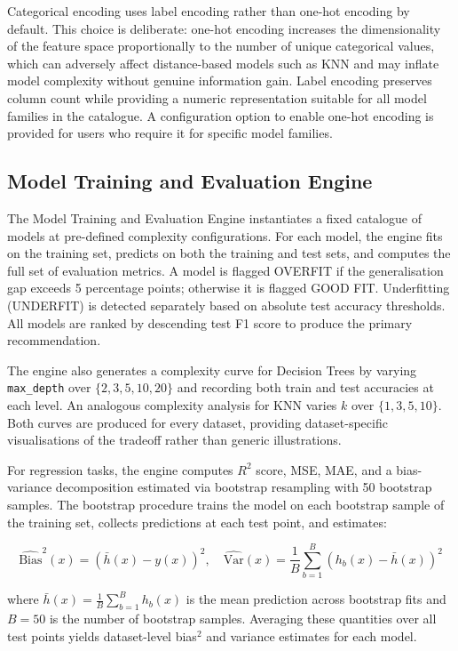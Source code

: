 \documentclass[conference]{IEEEtran}
\begin{document}
Categorical encoding uses label encoding rather than one-hot encoding by default. This choice is deliberate: one-hot encoding increases the dimensionality of the feature space proportionally to the number of unique categorical values, which can adversely affect distance-based models such as KNN and may inflate model complexity without genuine information gain. Label encoding preserves column count while providing a numeric representation suitable for all model families in the catalogue. A configuration option to enable one-hot encoding is provided for users who require it for specific model families.

\subsection{Model Training and Evaluation Engine}

The Model Training and Evaluation Engine instantiates a fixed catalogue of models at pre-defined complexity configurations. For each model, the engine fits on the training set, predicts on both the training and test sets, and computes the full set of evaluation metrics. A model is flagged OVERFIT if the generalisation gap exceeds 5 percentage points; otherwise it is flagged GOOD FIT. Underfitting (UNDERFIT) is detected separately based on absolute test accuracy thresholds. All models are ranked by descending test F1 score to produce the primary recommendation.

The engine also generates a complexity curve for Decision Trees by varying \texttt{max\_depth} over $\{2, 3, 5, 10, 20\}$ and recording both train and test accuracies at each level. An analogous complexity analysis for KNN varies $k$ over $\{1, 3, 5, 10\}$. Both curves are produced for every dataset, providing dataset-specific visualisations of the tradeoff rather than generic illustrations.

For regression tasks, the engine computes $R^2$ score, MSE, MAE, and a bias-variance decomposition estimated via bootstrap resampling with 50 bootstrap samples. The bootstrap procedure trains the model on each bootstrap sample of the training set, collects predictions at each test point, and estimates:

\begin{equation}
\hat{\text{Bias}}^2(x) = \left(\bar{h}(x) - y(x)\right)^2, \quad \hat{\text{Var}}(x) = \frac{1}{B}\sum_{b=1}^B \left(h_b(x) - \bar{h}(x)\right)^2
\end{equation}

where $\bar{h}(x) = \frac{1}{B}\sum_{b=1}^B h_b(x)$ is the mean prediction across bootstrap fits and $B=50$ is the number of bootstrap samples. Averaging these quantities over all test points yields dataset-level bias$^2$ and variance estimates for each model.
\end{document}

